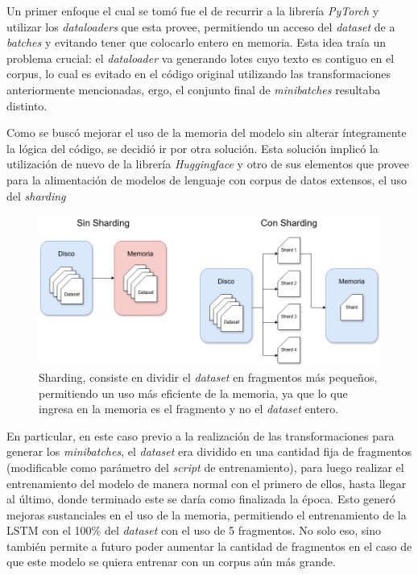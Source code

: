 Un primer enfoque el cual se tomó fue el de recurrir a la librería \textit{PyTorch} y utilizar los \textit{dataloaders} que esta provee, permitiendo un acceso del \textit{dataset} de a \textit{batches} y evitando tener que colocarlo entero en memoria. Esta idea traía un problema crucial: el \textit{dataloader} va generando lotes cuyo texto es contiguo en el corpus, lo cual es evitado en el código original utilizando las transformaciones anteriormente mencionadas, ergo, el conjunto final de \textit{minibatches} resultaba distinto.

Como se buscó mejorar el uso de la memoria del modelo sin alterar íntegramente la lógica del código, se decidió ir por otra solución. Esta solución implicó la utilización de nuevo de la librería \textit{Huggingface} y otro de sus elementos que provee para la alimentación de modelos de lenguaje con corpus de datos extensos, el uso del \textit{sharding} 

\begin{figure}[htb]
    \centering
    \includegraphics[width=1\textwidth]{imagenes/sharding.png}
    \caption{Sharding, consiste en dividir el \textit{dataset} en fragmentos más pequeños, permitiendo un uso más eficiente de la memoria, ya que lo que ingresa en la memoria es el fragmento y no el \textit{dataset} entero.}
    \label{fig:sharding}
\end{figure}

En particular, en este caso previo a la realización de las transformaciones para generar los \textit{minibatches}, el \textit{dataset} era dividido en una cantidad fija de fragmentos (modificable como parámetro del \textit{script} de entrenamiento), para luego realizar el entrenamiento del modelo de manera normal con el primero de ellos, hasta llegar al último, donde terminado este se daría como finalizada la época.  Esto generó mejoras sustanciales en el uso de la memoria, permitiendo el entrenamiento de la LSTM con el 100\% del \textit{dataset} con el uso de 5 fragmentos. No solo eso, sino también permite a futuro poder aumentar la cantidad de fragmentos en el caso de que este modelo se quiera entrenar con un corpus aún más grande.

